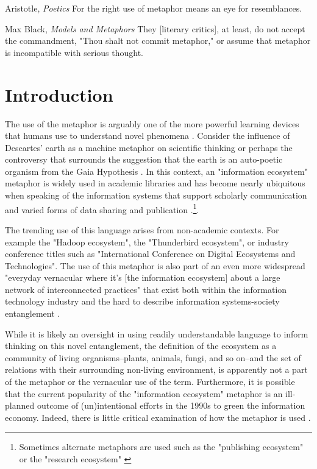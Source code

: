 \clearpage

\begin{epigraph}{Aristotle, \textit{Poetics}}
For the right use of metaphor means an eye for resemblances.
\end{epigraph}
\begin{epigraph}{Max Black, \textit{Models and Metaphors}}
They [literary critics], at least, do not accept the commandment, "Thou shalt not commit metaphor," or assume that metaphor is incompatible with serious thought.
\end{epigraph}

\section{Introduction}

The use of the metaphor is arguably one of the more powerful learning devices that humans use to understand novel phenomena \citep{livingstone_1981,anderson_2016}. Consider the influence of Descartes' earth as a machine metaphor on scientific thinking \citep{abram_1991} or perhaps the controversy that surrounds the suggestion that the earth is an auto-poetic organism from the Gaia Hypothesis \citep{lovelock_1974}. In this context, an "information ecosystem" metaphor is widely used in academic libraries and has become nearly ubiquitous when speaking of the information systems that support scholarly communication and varied forms of data sharing and publication \citep[for example see][]{walter_2008}.\footnote{Sometimes alternate metaphors are used such as the "publishing ecosystem" or the "research ecosystem" \citep[for respective examples see][]{esposito_2013,dylla_2016}}. 

The trending use of this language arises from non-academic contexts. For example the "Hadoop ecosystem", the "Thunderbird ecosystem", or industry conference titles such as "International Conference on Digital Ecosystems and Technologies". The use of this metaphor is also part of an even more widespread "everyday vernacular where it’s [the information ecosystem] about a large network of interconnected practices" that exist both within the information technology industry and the hard to describe information systems-society entanglement \citep{boyd_2016}. 

While it is likely an oversight in using readily understandable language to inform thinking on this novel entanglement, the definition of the ecosystem as a community of living organisms--plants, animals, fungi, and so on--and the set of relations with their surrounding non-living environment, is apparently not a part of the metaphor or the vernacular use of the term. Furthermore, it is possible that the current popularity of the "information ecosystem" metaphor is an ill-planned outcome of (un)intentional efforts in the 1990s to green the information economy. Indeed, there is little critical examination of how the metaphor is used \citep[although see][]{stepp_1999,nowviskie_2014}.

